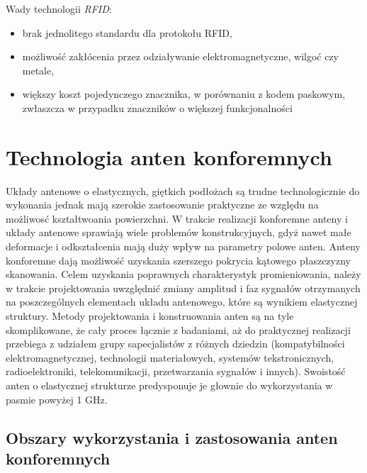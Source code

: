 Wady technologii \emph{RFID}:

\begin{itemize}\setlength{\itemsep}{0pt}

	\item brak jednolitego standardu dla protokołu RFID,
	
	\item możliwość zakłócenia przez odziaływanie elektromagnetyczne, wilgoć czy metale,
 	
 	\item większy koszt pojedynczego znacznika, w porównaniu z kodem paskowym, zwłaszcza w przypadku znaczników o większej funkcjonalności 

\end{itemize}





\chapter{Technologia anten konforemnych}

Układy antenowe o elastycznych, giętkich podłożach są trudne technologicznie do wykonania jednak mają szerokie zastosowanie praktyczne ze względu na możliwosć kształtwoania powierzchni. 
W trakcie realizacji konforemne anteny i układy antenowe sprawiają wiele problemów konstrukcyjnych, gdyż nawet małe deformacje i odkształcenia mają duży wpływ na parametry polowe anten. 
Anteny konforemne dają możliwość uzyskania szerszego pokrycia kątowego płaszczyzny skanowania. Celem uzyskania poprawnych charakterystyk promieniowania, należy w trakcie projektowania uwzględnić zmiany amplitud i faz sygnałów otrzymanych na poszczególnych elementach układu antenowego, które są wynikiem elastycznej struktury.    
Metody projektowania i konstruowania anten są na tyle skomplikowane, że cały proces łącznie z badaniami, aż do praktycznej realizacji przebiega z udziałem grupy sapecjalistów z różnych dziedzin (kompatybilności elektromagnetycznej, technologii materiałowych, systemów tekstronicznych, radioelektroniki, telekomunikacji, przetwarzania sygnałów i innych). Swoistość anten o elastycznej strukturze predysponuje je głownie do wykorzystania w pasmie powyżej 1 GHz.     

\section{Obszary wykorzystania i zastosowania anten konforemnych}

